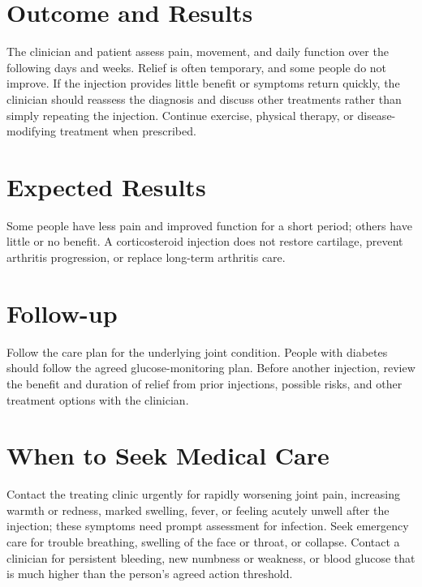 \section*{Outcome and Results}
The clinician and patient assess pain, movement, and daily function over the following days and weeks. Relief is often temporary, and some people do not improve. If the injection provides little benefit or symptoms return quickly, the clinician should reassess the diagnosis and discuss other treatments rather than simply repeating the injection. Continue exercise, physical therapy, or disease-modifying treatment when prescribed.

\section*{Expected Results}
Some people have less pain and improved function for a short period; others have little or no benefit. A corticosteroid injection does not restore cartilage, prevent arthritis progression, or replace long-term arthritis care.

\section*{Follow-up}
Follow the care plan for the underlying joint condition. People with diabetes should follow the agreed glucose-monitoring plan. Before another injection, review the benefit and duration of relief from prior injections, possible risks, and other treatment options with the clinician.

\section*{When to Seek Medical Care}
Contact the treating clinic urgently for rapidly worsening joint pain, increasing warmth or redness, marked swelling, fever, or feeling acutely unwell after the injection; these symptoms need prompt assessment for infection. Seek emergency care for trouble breathing, swelling of the face or throat, or collapse. Contact a clinician for persistent bleeding, new numbness or weakness, or blood glucose that is much higher than the person's agreed action threshold.


